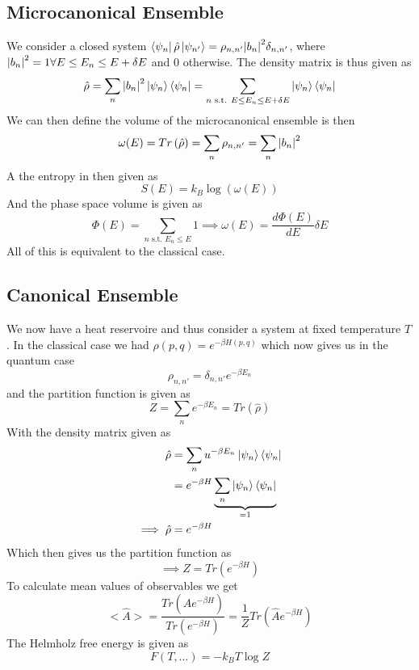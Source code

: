 \documentclass{report}
\begin{document}
\subsection{Microcanonical Ensemble}
We consider a closed system $\bra{\psi_n} \hat{\rho} \ket{\psi_{n'}} = \rho_{n,n'} \abs{b_n}^2 \delta_{n,n'}$, where $\abs{b_n}^2 = 1 \forall E \le  E_n \le E+\delta E$ and $0$ otherwise. The density matrix is thus given as \[
  \hat{\rho} = \sum_{n} \abs{b_n}^2 \ket{\psi_n} \bra{\psi_n} 
= \sum_{n \text{ s.t. } E\le  E_n \le E + \delta E} \ket{\psi_n} \bra{\psi_n} 
\] 
We can then define the volume of the microcanonical ensemble is then \[
  \omega(E) = Tr\left( \hat{\rho} \right) = \sum_{n} \rho_{n,n'} = \sum_{n} \abs{b_n}^2  
\] 
A the entropy in then given as \[
  S\left( E \right) = k_B \log\left( \omega\left( E \right)  \right) 
\] 
And the phase space volume is given as \[
  \Phi\left( E \right) = \sum_{n \text{ s.t. } E_n \le E} 1 \implies \omega(E) = \frac{d\Phi\left( E \right) }{d E} \delta E 
\] 
All of this is equivalent to the classical case.
\subsection{Canonical Ensemble}
We now have a heat reservoire and thus consider a system at fixed temperature $T$. In the classical case we had $\rho\left( p,q \right) = e^{-\beta H\left( p,q \right) }$ which now gives us in the quantum case \[
\rho_{n,n'} = \delta_{n,n'} e^{-\beta E_n}
\]  
and the partition function is given as \[
  Z = \sum_{n} e^{-\beta E_n} = Tr\left( \hat{\rho} \right)  
\] 
With the density matrix given as
\begin{align*}
  \hat{\rho} &=  \sum_{n} u^{-\beta E_n} \ket{\psi_n}\bra{\psi_n}  \\
             &= e^{-\beta H} \underbrace{ \sum_{n} \ket{\psi_n}\bra{\psi_n}}_{= 1} \\
             \implies \hat{\rho} &=  e^{-\beta H}
\end{align*}
Which then gives us the partition function as \[
  \implies Z = Tr\left( e^{-\beta H} \right) 
\] 
To calculate mean values of observables we get \[
  <\hat{A}> = \frac{Tr\left( \hat{A} e^{-\beta H} \right) }{Tr\left( e^{-\beta H} \right) } = \frac{1}{Z} Tr\left( \hat{A} e^{-\beta H} \right) 
\] 
The Helmholz free energy is given as \[
  F\left( T,\ldots \right) = -k_B T \log Z
\] 
\end{document}
